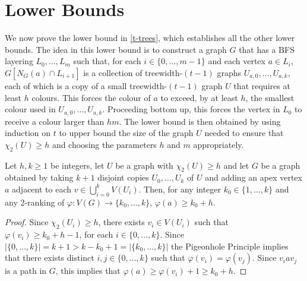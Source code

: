 \documentclass[kpfonts]{patmorin}
\newcommand{\trn}{\chi_2}
\theoremstyle{named}
\begin{document}
\section{Lower Bounds}
\label{lower-bounds}

We now prove the lower bound in \cref{t-trees}, which establishes all the other lower bounds. The idea in this lower bound is to construct a graph $G$ that has a BFS layering $L_0,\ldots,L_m$ such that, for each $i\in\{0,\ldots,m-1\}$ and each vertex $a\in L_i$, $G[N_G(a)\cap L_{i+1}]$ is a collection of treewidth-$(t-1)$ graphs $U_{a,0},\ldots,U_{a,k}$, each of which is a copy of a small treewidth-$(t-1)$ graph $U$ that requires at least $h$ colours.  This forces the colour of $a$ to exceed, by at least $h$, the smallest colour used in $U_{a,0},\ldots,U_{a,k}$.  Proceeding bottom up, this forces the vertex in $L_0$ to receive a colour larger than $hm$.  The lower bound is then obtained by using induction on $t$ to upper bound the size of the graph $U$ needed to ensure that $\trn(U)\ge h$ and choosing the parameters $h$ and $m$ appropriately.

\begin{lem}\label{apex-graph}
    Let $h,k\ge 1$ be integers, let $U$ be a graph with $\trn(U)\ge h$ and let $G$ be a graph obtained by taking $k+1$ disjoint copies $U_0,\ldots,U_k$ of $U$ and adding an apex vertex $a$ adjacent to each $v\in\bigcup_{i=0}^k V(U_i)$.  Then, for any integer $k_0\in \{1,\ldots,k\}$ and any 2-ranking of $\varphi:V(G)\to\{k_0,\ldots,k\}$, $\varphi(a) \ge k_0+h$.
\end{lem}

\begin{proof}
    Since $\trn(U_i)\ge h$, there exists $v_i\in V(U_i)$ such that $\varphi(v_i)\ge k_0+h-1$, for each $i\in\{0,\ldots,k\}$.  Since $|\{0,\ldots,k\}|=k+1>k-k_0+1=|\{k_0,\ldots,k\}|$ the Pigeonhole Principle implies that there exists distinct $i,j\in\{0,\ldots,k\}$ such that $\varphi(v_i)=\varphi(v_j)$.  Since $v_i a v_j$ is a path in $G$, this implies that $\varphi(a)\ge \varphi(v_i)+1\ge k_0+h$.
\end{proof}

\end{document}
